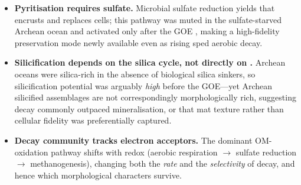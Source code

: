\documentclass[11pt]{article}
\begin{document}
\begin{itemize}\itemsep0pt
\item \textbf{Pyritisation requires sulfate.} Microbial sulfate reduction yields  that
encrusts and replaces cells; this pathway was muted in the sulfate-starved Archean ocean
\citep{Habicht2002,Crowe2014} and activated only after the GOE \citep{Kah2004}, making a
high-fidelity preservation mode newly available even as rising  sped aerobic decay.
\item \textbf{Silicification depends on the silica cycle, not directly on .} Archean oceans
were silica-rich in the absence of biological silica sinkers, so silicification potential was
arguably \emph{high} before the GOE---yet Archean silicified assemblages are not correspondingly
morphologically rich, suggesting decay commonly outpaced mineralisation, or that mat texture rather
than cellular fidelity was preferentially captured.
\item \textbf{Decay community tracks electron acceptors.} The dominant OM-oxidation pathway shifts
with redox (aerobic respiration $\to$ sulfate reduction $\to$ methanogenesis), changing both the
\emph{rate} and the \emph{selectivity} of decay, and hence which morphological characters survive.
\end{itemize}
\end{document}

